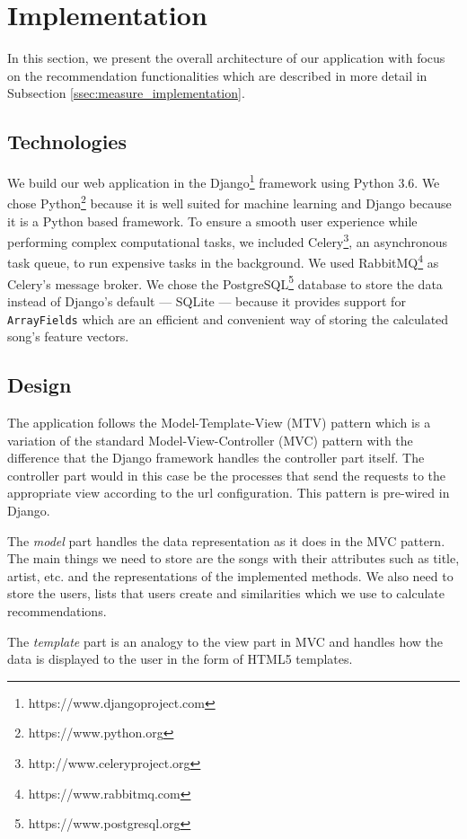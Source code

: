\section{Implementation}\label{sec:implementation}
In this section, we present the overall architecture of our application with focus on the recommendation functionalities which are described in more detail in Subsection \ref{ssec:measure_implementation}. 

\subsection{Technologies}

We build our web application in the Django\footnote{https://www.djangoproject.com} framework using Python 3.6. We chose Python\footnote{https://www.python.org} because it is well suited for machine learning and Django because it is a Python based framework. To ensure a smooth user experience while performing complex computational tasks, we included Celery\footnote{http://www.celeryproject.org}, an asynchronous task queue, to run expensive tasks in the background. We used RabbitMQ\footnote{https://www.rabbitmq.com} as Celery's message broker. We chose the PostgreSQL\footnote{https://www.postgresql.org} database to store the data instead of Django's default --- SQLite --- because it provides support for \texttt{ArrayFields} which are an efficient and convenient way of storing the calculated song's feature vectors.

\subsection{Design}
The application follows the Model-Template-View (MTV) pattern which is a variation of the standard Model-View-Controller (MVC) pattern with the difference that the Django framework handles the controller part itself. The controller part would in this case be the processes that send the requests to the appropriate view according to the url configuration.
This pattern is pre-wired in Django.

The \textit{model} part handles the data representation as it does in the MVC pattern. The main things we need to store are the songs with their attributes such as title, artist, etc. and the representations of the implemented methods. We also need to store the users, lists that users create and similarities which we use to calculate recommendations.

The \textit{template} part is an analogy to the view part in MVC and handles how the data is displayed to the user in the form of HTML5 templates.

